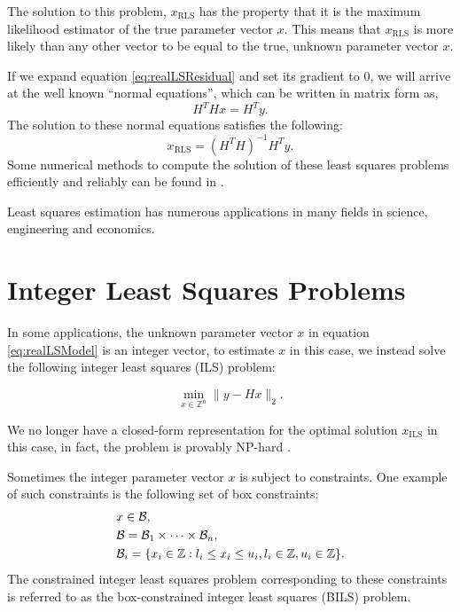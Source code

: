 \documentclass[12pt,Bold,letterpaper]{mcgilletdclass}
\newcommand{\be}{\begin{equation}}
\newcommand{\ee}{\end{equation}}
\newcommand{\boxcon}{{\cal B}}
\newcommand{\vsp}{\vspace{\baselineskip}}
\begin{document}
The solution to this problem, $x_{\scriptscriptstyle{\mathrm{RLS}}}$ has the property that it is the maximum likelihood estimator of the true parameter vector $x$. This means that $x_{\scriptscriptstyle{\mathrm{RLS}}}$ is more likely than any other vector to be equal to the true, unknown parameter vector $x$. 

If we expand equation \eqref{eq:realLSResidual} and set its gradient to $0$, we will arrive at the
well known ``normal equations'', which can be written in matrix form as,
\begin{equation}
H^THx = H^Ty.
\label{eq:normalEquations}
\end{equation}
The solution to these normal equations satisfies the following:
$$x_{\scriptscriptstyle{\mathrm{RLS}}} = (H^TH)^{-1}H^Ty.$$
Some numerical methods to compute the solution of these least squares problems efficiently and reliably can be found in \cite{Bjo96}.

Least squares estimation has numerous applications in many fields in science, engineering and economics.

\vsp \section{Integer Least Squares Problems}
In some applications, the unknown parameter vector $x$ in equation \eqref{eq:realLSModel} is an integer vector, to estimate $x$ in this case, we instead solve the following integer least squares (ILS) problem:

\be
\label{eq:ils0}
\min_{x \in {\mathbb{Z}}^n}  \| y- Hx \|_2. 
\ee

We no longer have a closed-form representation for the optimal solution $x_{\scriptscriptstyle{\mathrm{ILS}}}$ in this case, in fact, the
problem is provably NP-hard \cite{Mic01}.  

Sometimes the integer parameter vector $x$ is subject to constraints. One example of such constraints is the following set of box constraints:
\begin{align} \label{eq:boxCon}
&x\in \boxcon,\\
&{\cal B} = {\cal B}_1  \times \cdots \times {\cal B}_n,\\
&\boxcon_i = \{x_i\in\mathbb{Z} : l_i\le x_i \le u_i, l_i\in \mathbb{Z},
u_i\in\mathbb{Z} \}.
\end{align}
The constrained integer least squares problem corresponding to these constraints is referred to as the box-constrained integer least squares (BILS) problem. 
\end{document}
